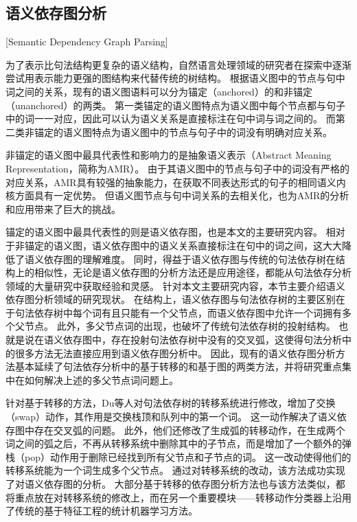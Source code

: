 \subsection{语义依存图分析}[Semantic Dependency Graph Parsing]
\label{sec:sdp}

为了表示比句法结构更复杂的语义结构，自然语言处理领域的研究者在探索中逐渐尝试用表示能力更强的图结构来代替传统的树结构。
根据语义图中的节点与句中词之间的关系，现有的语义图语料可以分为锚定（anchored）的和非锚定（unanchored）的两类。
第一类锚定的语义图特点为语义图中每个节点都与句子中的词一一对应，因此可以认为语义关系是直接标注在句中词与词之间的。
而第二类非锚定的语义图特点为语义图中的节点与句子中的词没有明确对应关系。

非锚定的语义图中最具代表性和影响力的是抽象语义表示（Abstract Meaning Representation，简称为AMR）。\cite{banarescu-etal-2013-abstract}
由于其语义图中的节点与句子中的词没有严格的对应关系，AMR具有较强的抽象能力，在获取不同表达形式的句子的相同语义内核方面具有一定优势。
但语义图节点与句中词关系的去相关化，也为AMR的分析和应用带来了巨大的挑战。

锚定的语义图中最具代表性的则是语义依存图，也是本文的主要研究内容。
相对于非锚定的语义图，语义依存图中的语义关系直接标注在句中的词之间，这大大降低了语义依存图的理解难度。
同时，得益于语义依存图与传统的句法依存树在结构上的相似性，无论是语义依存图的分析方法还是应用途径，都能从句法依存分析领域的大量研究中获取经验和灵感。
针对本文主要研究内容，本节主要介绍语义依存图分析领域的研究现状。
在结构上，语义依存图与句法依存树的主要区别在于句法依存树中每个词有且只能有一个父节点，而语义依存图中允许一个词拥有多个父节点。
此外，多父节点词的出现，也破坏了传统句法依存树的投射结构。
也就是说在语义依存图中，存在投射句法依存树中没有的交叉弧，这使得句法分析中的很多方法无法直接应用到语义依存图分析中。
因此，现有的语义依存图分析方法基本延续了句法依存分析中的基于转移的和基于图的两类方法，并将研究重点集中在如何解决上述的多父节点词问题上。

针对基于转移的方法，Du等人对句法依存树的转移系统进行修改\cite{du-etal-2014-peking}，增加了交换（swap）动作，其作用是交换栈顶和队列中的第一个词。
这一动作解决了语义依存图中存在交叉弧的问题。
此外，他们还修改了生成弧的转移动作，在生成两个词之间的弧之后，不再从转移系统中删除其中的子节点，而是增加了一个额外的弹栈（pop）动作用于删除已经找到所有父节点和子节点的词。
这一改动使得他们的转移系统能为一个词生成多个父节点。
通过对转移系统的改动，该方法成功实现了对语义依存图的分析。
大部分基于转移的依存图分析方法\cite{sagae-tsujii-2008-shift,titov-etal-2009-online}也与该方法类似，都将重点放在对转移系统的修改上，而在另一个重要模块——转移动作分类器上沿用了传统的基于特征工程的统计机器学习方法。

